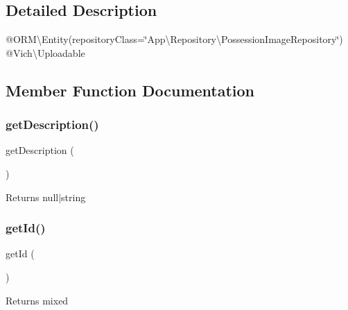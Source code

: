 \subsection{Detailed Description}
@\+O\+RM\textbackslash{}\+Entity(repository\+Class=\char`\"{}\+App\textbackslash{}\+Repository\textbackslash{}\+Possession\+Image\+Repository\char`\"{}) @\+Vich\textbackslash{}\+Uploadable 

\subsection{Member Function Documentation}
\mbox{\label{class_app_1_1_entity_1_1_possession_image_a2e7bb35c71bf1824456ceb944cb7a845}} 
\subsubsection{\texorpdfstring{getDescription()}{getDescription()}}
{\footnotesize\ttfamily get\+Description (\begin{DoxyParamCaption}{ }\end{DoxyParamCaption})}

\begin{DoxyReturn}{Returns}
null$\vert$string 
\end{DoxyReturn}
\mbox{\label{class_app_1_1_entity_1_1_possession_image_a12251d0c022e9e21c137a105ff683f13}} 
\subsubsection{\texorpdfstring{getId()}{getId()}}
{\footnotesize\ttfamily get\+Id (\begin{DoxyParamCaption}{ }\end{DoxyParamCaption})}

\begin{DoxyReturn}{Returns}
mixed 
\end{DoxyReturn}
\mbox{\label{class_app_1_1_entity_1_1_possession_image_ae3109cb4ea5ad176dab6f13b519a126e}} 
